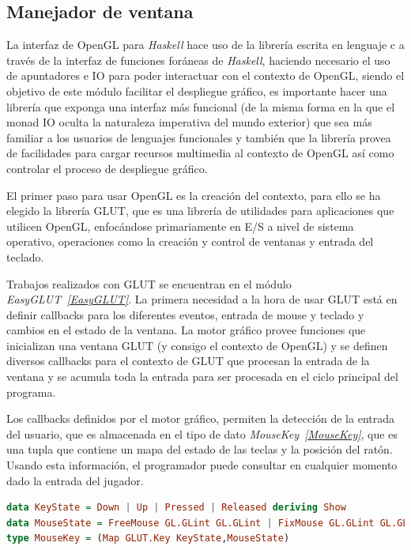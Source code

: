 \subsection{Manejador de ventana}

La interfaz de OpenGL para \emph{Haskell} hace uso de la librería escrita en lenguaje c a través de la interfaz de funciones foráneas de \emph{Haskell}, haciendo necesario el uso de apuntadores e IO para poder interactuar con el contexto de OpenGL, siendo el objetivo de este módulo facilitar el despliegue gráfico, es importante hacer una librería que exponga una interfaz más funcional (de la misma forma en la que el monad IO oculta la naturaleza imperativa del mundo exterior) que sea más familiar a los usuarios de lenguajes funcionales y también que la librería provea de facilidades para cargar recursos multimedia al contexto de OpenGL así como controlar el proceso de despliegue gráfico.

El primer paso para usar OpenGL es la creación del contexto, para ello se ha elegido la librería GLUT, que es una librería de utilidades para aplicaciones que utilicen OpenGL, enfocándose primariamente en E/S a nivel de sistema operativo, operaciones como la creación y control de ventanas y entrada del teclado.

Trabajos realizados con GLUT se encuentran en el módulo \emph{EasyGLUT~\ref{EasyGLUT}}. La primera necesidad a la hora de usar GLUT está en definir callbacks para los diferentes eventos, entrada de mouse y teclado y cambios en el estado de la ventana. La motor gráfico provee funciones que inicializan una ventana GLUT (y consigo el contexto de OpenGL) y se definen diversos callbacks para el contexto de GLUT que procesan la entrada de la ventana y se acumula toda la entrada para ser procesada en el ciclo principal del programa.

Los callbacks definidos por el motor gráfico, permiten la detección de la entrada del usuario, que es almacenada en el tipo de dato \emph{MouseKey~\ref{MouseKey}}, que es una tupla que contiene un mapa del estado de las teclas y la posición del ratón. Usando esta información, el programador puede consultar en cualquier momento dado la entrada del jugador.

\begin{lstlisting}[label={MouseKey},frame=single,language=Haskell]
data KeyState = Down | Up | Pressed | Released deriving Show
data MouseState = FreeMouse GL.GLint GL.GLint | FixMouse GL.GLint GL.GLint
type MouseKey = (Map GLUT.Key KeyState,MouseState)
\end{lstlisting}

